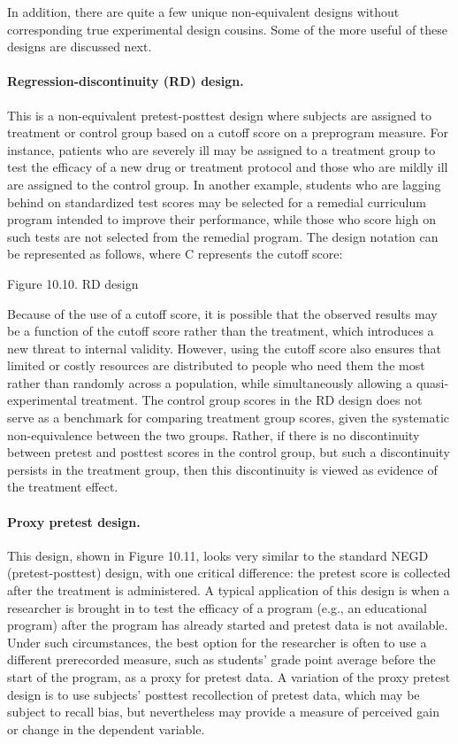 In addition, there are quite a few unique non-equivalent designs without corresponding true experimental design cousins. Some of the more useful of these designs are discussed next.

\paragraph{Regression-discontinuity (RD) design.} This is a non-equivalent pretest-posttest design where subjects are assigned to treatment or control group based on a cutoff score on a preprogram measure. For instance, patients who are severely ill may be assigned to a treatment group to test the efficacy of a new drug or treatment protocol and those who are mildly ill are assigned to the control group. In another example, students who are lagging behind on standardized test scores may be selected for a remedial curriculum program intended to improve their performance, while those who score high on such tests are not selected from the remedial program. The design notation can be represented as follows, where C represents the cutoff score:

Figure 10.10. RD design

Because of the use of a cutoff score, it is possible that the observed results may be a function of the cutoff score rather than the treatment, which introduces a new threat to internal validity. However, using the cutoff score also ensures that limited or costly resources are distributed to people who need them the most rather than randomly across a population, while simultaneously allowing a quasi-experimental treatment. The control group scores in the RD design does not serve as a benchmark for comparing treatment group scores, given the systematic non-equivalence between the two groups. Rather, if there is no discontinuity between pretest and posttest scores in the control group, but such a discontinuity persists in the treatment group, then this discontinuity is viewed as evidence of the treatment effect.

\paragraph{Proxy pretest design.} This design, shown in Figure 10.11, looks very similar to the standard NEGD (pretest-posttest) design, with one critical difference: the pretest score is collected after the treatment is administered. A typical application of this design is when a researcher is brought in to test the efficacy of a program (e.g., an educational program) after the program has already started and pretest data is not available. Under such circumstances, the best option for the researcher is often to use a different prerecorded measure, such as students’ grade point average before the start of the program, as a proxy for pretest data. A variation of the proxy pretest design is to use subjects’ posttest recollection of pretest data, which may be subject to recall bias, but nevertheless may provide a measure of perceived gain or change in the dependent variable.

